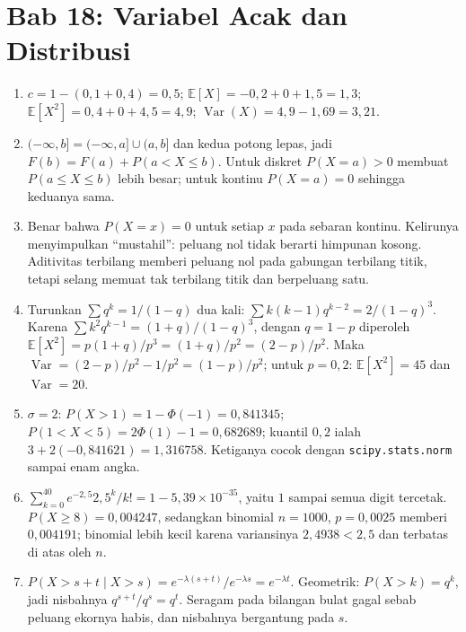 \section*{Bab 18: Variabel Acak dan Distribusi}
\begin{enumerate}[label=\textbf{18.\arabic*}]
  \item $c=1-(0{,}1+0{,}4)=0{,}5$; $\mathbb{E}[X]=-0{,}2+0+1{,}5=1{,}3$;
        $\mathbb{E}[X^{2}]=0{,}4+0+4{,}5=4{,}9$; $\operatorname{Var}(X)=4{,}9-1{,}69=3{,}21$.

  \item $(-\infty,b]=(-\infty,a]\cup(a,b]$ dan kedua potong lepas, jadi
        $F(b)=F(a)+P(a<X\le b)$. Untuk diskret $P(X=a)>0$ membuat
        $P(a\le X\le b)$ lebih besar; untuk kontinu $P(X=a)=0$ sehingga keduanya sama.

  \item Benar bahwa $P(X=x)=0$ untuk setiap $x$ pada sebaran kontinu. Kelirunya
        menyimpulkan ``mustahil'': peluang nol tidak berarti himpunan kosong.
        Aditivitas terbilang memberi peluang nol pada gabungan terbilang titik, tetapi
        selang memuat tak terbilang titik dan berpeluang satu.

  \item Turunkan $\sum q^{k}=1/(1-q)$ dua kali: $\sum k(k-1)q^{k-2}=2/(1-q)^{3}$.
        Karena $\sum k^{2}q^{k-1}=(1+q)/(1-q)^{3}$, dengan $q=1-p$ diperoleh
        $\mathbb{E}[X^{2}]=p(1+q)/p^{3}=(1+q)/p^{2}=(2-p)/p^{2}$.
        Maka $\operatorname{Var}=(2-p)/p^{2}-1/p^{2}=(1-p)/p^{2}$; untuk $p=0{,}2$:
        $\mathbb{E}[X^{2}]=45$ dan $\operatorname{Var}=20$.

  \item $\sigma=2$: $P(X>1)=1-\Phi(-1)=0{,}841345$;
        $P(1<X<5)=2\Phi(1)-1=0{,}682689$; kuantil $0{,}2$ ialah
        $3+2(-0{,}841621)=1{,}316758$. Ketiganya cocok dengan
        \texttt{scipy.stats.norm} sampai enam angka.

  \item $\sum_{k=0}^{40}e^{-2{,}5}2{,}5^{k}/k!=1-5{,}39\times10^{-35}$, yaitu $1$
        sampai semua digit tercetak. $P(X\ge8)=0{,}004247$, sedangkan binomial
        $n=1000$, $p=0{,}0025$ memberi $0{,}004191$; binomial lebih kecil karena
        variansinya $2{,}4938<2{,}5$ dan terbatas di atas oleh $n$.

  \item $P(X>s+t\mid X>s)=e^{-\lambda(s+t)}/e^{-\lambda s}=e^{-\lambda t}$.
        Geometrik: $P(X>k)=q^{k}$, jadi nisbahnya $q^{s+t}/q^{s}=q^{t}$. Seragam pada
        bilangan bulat gagal sebab peluang ekornya habis, dan nisbahnya bergantung
        pada $s$.


\end{enumerate}
